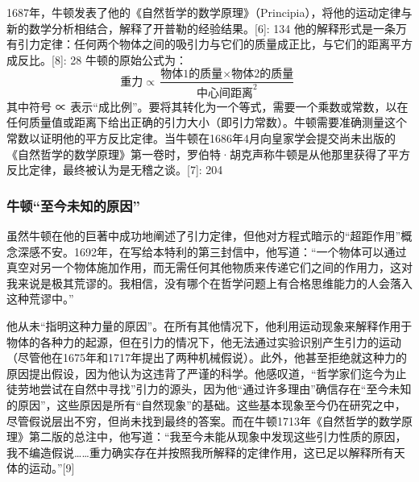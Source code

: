 1687年，牛顿发表了他的《自然哲学的数学原理》（Principia），将他的运动定律与新的数学分析相结合，解释了开普勒的经验结果。[6]: 134 他的解释形式是一条万有引力定律：任何两个物体之间的吸引力与它们的质量成正比，与它们的距离平方成反比。[8]: 28 牛顿的原始公式为：
\[
\text{重力} \propto \frac{\text{物体1的质量} \times \text{物体2的质量}}{\text{中心间距离}^2}~
\]
其中符号 ∝ 表示“成比例”。要将其转化为一个等式，需要一个乘数或常数，以在任何质量值或距离下给出正确的引力大小（即引力常数）。牛顿需要准确测量这个常数以证明他的平方反比定律。当牛顿在1686年4月向皇家学会提交尚未出版的《自然哲学的数学原理》第一卷时，罗伯特·胡克声称牛顿是从他那里获得了平方反比定律，最终被认为是无稽之谈。[7]: 204
\subsubsection{牛顿“至今未知的原因”}
虽然牛顿在他的巨著中成功地阐述了引力定律，但他对方程式暗示的“超距作用”概念深感不安。1692年，在写给本特利的第三封信中，他写道：“一个物体可以通过真空对另一个物体施加作用，而无需任何其他物质来传递它们之间的作用力，这对我来说是极其荒谬的。我相信，没有哪个在哲学问题上有合格思维能力的人会落入这种荒谬中。”

他从未“指明这种力量的原因”。在所有其他情况下，他利用运动现象来解释作用于物体的各种力的起源，但在引力的情况下，他无法通过实验识别产生引力的运动（尽管他在1675年和1717年提出了两种机械假说）。此外，他甚至拒绝就这种力的原因提出假设，因为他认为这违背了严谨的科学。他感叹道，“哲学家们迄今为止徒劳地尝试在自然中寻找”引力的源头，因为他“通过许多理由”确信存在“至今未知的原因”，这些原因是所有“自然现象”的基础。这些基本现象至今仍在研究之中，尽管假说层出不穷，但尚未找到最终的答案。而在牛顿1713年《自然哲学的数学原理》第二版的总注中，他写道：“我至今未能从现象中发现这些引力性质的原因，我不编造假说……重力确实存在并按照我所解释的定律作用，这已足以解释所有天体的运动。”[9]
